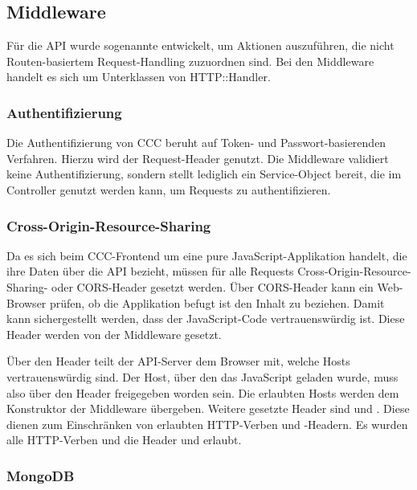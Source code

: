 \subsection{Middleware}
\label{ssec:ba_middleware}

Für die API wurde sogenannte  entwickelt, um Aktionen
auszuführen, die nicht Routen-basiertem Request-Handling zuzuordnen sind.  Bei
den Middleware handelt es sich um Unterklassen von HTTP::Handler.

\subsubsection{Authentifizierung}
\label{sssec:bam_authentifizierung}

Die Authentifizierung von CCC beruht auf Token- und Passwort-basierenden
Verfahren.  Hierzu wird der Request-Header  genutzt.  Die
Middleware  validiert keine Authentifizierung, sondern stellt
lediglich ein Service-Object  bereit, die im Controller
genutzt werden kann, um Requests zu authentifizieren.

\subsubsection{Cross-Origin-Resource-Sharing}
\label{sssec:bam_cors}

Da es sich beim CCC-Frontend um eine pure JavaScript-Applikation handelt, die
ihre Daten über die API bezieht, müssen für alle Requests
Cross-Origin-Resource-Sharing- oder CORS-Header gesetzt werden. Über
CORS-Header kann ein Web-Browser prüfen, ob die Applikation befugt ist den
Inhalt zu beziehen.  Damit kann sichergestellt werden, dass der JavaScript-Code
vertrauenswürdig ist.  Diese Header werden von der Middleware 
gesetzt.

Über den Header  teilt der API-Server dem
Browser mit, welche Hosts vertrauenswürdig sind.  Der Host, über den
das JavaScript geladen wurde, muss also über den Header freigegeben worden
sein.  Die erlaubten Hosts werden dem Konstruktor der Middleware übergeben.
Weitere gesetzte Header sind  und
.  Diese dienen zum Einschränken von
erlaubten HTTP-Verben und -Headern.  Es wurden alle HTTP-Verben und die Header
 und  erlaubt.

\subsubsection{MongoDB}
\label{sssec:bam_mongodb}

